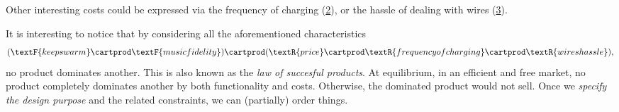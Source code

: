 \begin{figure}[h!]
	\centering
	\caption{}
	\label{fig:headpho_price}
\end{figure}

Other interesting costs could be expressed via the frequency of charging (\cref{fig:headpho_charge}), or the hassle of dealing with wires (\cref{fig:headpho_wires}).

\begin{figure}[h!]
	\centering
	\caption{}
	\label{fig:headpho_charge}
\end{figure}

\begin{figure}[h!]
	\centering
	\caption{}
	\label{fig:headpho_wires}
\end{figure}

It is interesting to notice that by considering all the aforementioned characteristics
\begin{equation*}
	(\textF{keeps warm}\cartprod \textF{music fidelity})
	\cartprod (\textR{price}\cartprod \textR{frequency of charging}\cartprod \textR{wires hassle}),
\end{equation*}
no product dominates another.
This is also known as the \emph{law of succesful products}.
At equilibrium, in an efficient and free market, no product completely dominates another by both functionality and costs.
Otherwise, the dominated product would not sell.
Once we \emph{specify the design purpose} and the related constraints, we can (partially) order things.

